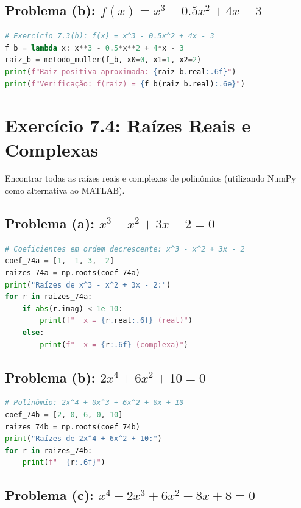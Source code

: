 \documentclass[
	12pt,				%
	openright,			%
	oneside,			%
	a4paper,			%
	english,			%
	brazil				%
	]{abntex2}
\begin{document}
\subsection{Problema (b): $f(x) = x^3 - 0.5x^2 + 4x - 3$}

\begin{lstlisting}[language=Python, caption={Exercício 7.3(b) - Raiz via Müller}]
# Exercício 7.3(b): f(x) = x^3 - 0.5x^2 + 4x - 3
f_b = lambda x: x**3 - 0.5*x**2 + 4*x - 3
raiz_b = metodo_muller(f_b, x0=0, x1=1, x2=2)
print(f"Raiz positiva aproximada: {raiz_b.real:.6f}")
print(f"Verificação: f(raiz) = {f_b(raiz_b.real):.6e}")
\end{lstlisting}

\section{Exercício 7.4: Raízes Reais e Complexas}

Encontrar todas as raízes reais e complexas de polinômios (utilizando NumPy como alternativa ao MATLAB).

\subsection{Problema (a): $x^3 - x^2 + 3x - 2 = 0$}

\begin{lstlisting}[language=Python, caption={Exercício 7.4(a) - Raízes via NumPy}]
# Coeficientes em ordem decrescente: x^3 - x^2 + 3x - 2
coef_74a = [1, -1, 3, -2]
raizes_74a = np.roots(coef_74a)
print("Raízes de x^3 - x^2 + 3x - 2:")
for r in raizes_74a:
    if abs(r.imag) < 1e-10:
        print(f"  x = {r.real:.6f} (real)")
    else:
        print(f"  x = {r:.6f} (complexa)")
\end{lstlisting}

\subsection{Problema (b): $2x^4 + 6x^2 + 10 = 0$}

\begin{lstlisting}[language=Python, caption={Exercício 7.4(b) - Raízes Complexas}]
# Polinômio: 2x^4 + 0x^3 + 6x^2 + 0x + 10
coef_74b = [2, 0, 6, 0, 10]
raizes_74b = np.roots(coef_74b)
print("Raízes de 2x^4 + 6x^2 + 10:")
for r in raizes_74b:
    print(f"  {r:.6f}")
\end{lstlisting}

\subsection{Problema (c): $x^4 - 2x^3 + 6x^2 - 8x + 8 = 0$}
\end{document}
